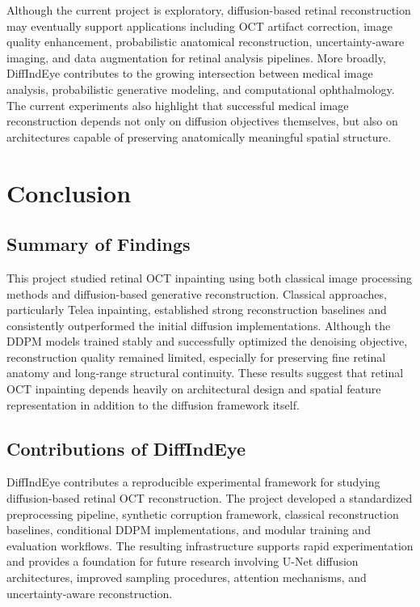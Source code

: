 \documentclass[12pt,oneside]{article}
\begin{document}
Although the current project is exploratory, diffusion-based retinal reconstruction may eventually support applications including OCT artifact correction, image quality enhancement, probabilistic anatomical reconstruction, uncertainty-aware imaging, and data augmentation for retinal analysis pipelines. More broadly, DiffIndEye contributes to the growing intersection between medical image analysis, probabilistic generative modeling, and computational ophthalmology. The current experiments also highlight that successful medical image reconstruction depends not only on diffusion objectives themselves, but also on architectures capable of preserving anatomically meaningful spatial structure.

\section{Conclusion}

\subsection*{Summary of Findings}

This project studied retinal OCT inpainting using both classical image processing methods and diffusion-based generative reconstruction. Classical approaches, particularly Telea inpainting, established strong reconstruction baselines and consistently outperformed the initial diffusion implementations. Although the DDPM models trained stably and successfully optimized the denoising objective, reconstruction quality remained limited, especially for preserving fine retinal anatomy and long-range structural continuity. These results suggest that retinal OCT inpainting depends heavily on architectural design and spatial feature representation in addition to the diffusion framework itself.

\subsection*{Contributions of DiffIndEye}

DiffIndEye contributes a reproducible experimental framework for studying diffusion-based retinal OCT reconstruction. The project developed a standardized preprocessing pipeline, synthetic corruption framework, classical reconstruction baselines, conditional DDPM implementations, and modular training and evaluation workflows. The resulting infrastructure supports rapid experimentation and provides a foundation for future research involving U-Net diffusion architectures, improved sampling procedures, attention mechanisms, and uncertainty-aware reconstruction.
\end{document}
